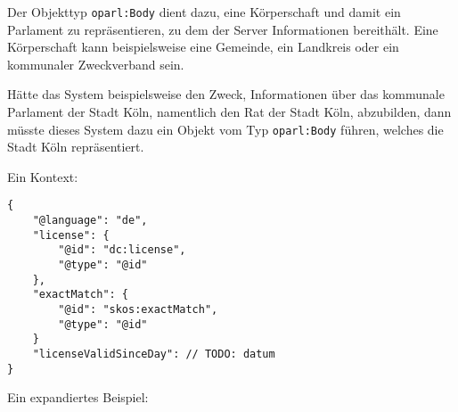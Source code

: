 \documentclass[,a4paper]{article}
\begin{document}

Der Objekttyp \texttt{oparl:Body} dient dazu, eine Körperschaft und
damit ein Parlament zu repräsentieren, zu dem der Server Informationen
bereithält. Eine Körperschaft kann beispielsweise eine Gemeinde, ein
Landkreis oder ein kommunaler Zweckverband sein.

Hätte das System beispielsweise den Zweck, Informationen über das
kommunale Parlament der Stadt Köln, namentlich den Rat der Stadt Köln,
abzubilden, dann müsste dieses System dazu ein Objekt vom Typ
\texttt{oparl:Body} führen, welches die Stadt Köln repräsentiert.

Ein Kontext:

\begin{verbatim}
{
    "@language": "de",
    "license": {
        "@id": "dc:license",
        "@type": "@id"
    },
    "exactMatch": {
        "@id": "skos:exactMatch",
        "@type": "@id"
    }
    "licenseValidSinceDay": // TODO: datum
}
\end{verbatim}

Ein expandiertes Beispiel:
\end{document}
